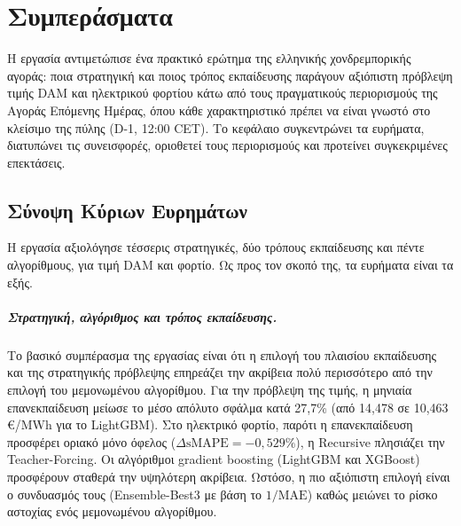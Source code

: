 \chapter{Συμπεράσματα}
\label{ch:conclusions}

Η εργασία αντιμετώπισε ένα πρακτικό ερώτημα της ελληνικής χονδρεμπορικής αγοράς: ποια
στρατηγική και ποιος τρόπος εκπαίδευσης παράγουν αξιόπιστη πρόβλεψη τιμής DAM και
ηλεκτρικού φορτίου κάτω από τους πραγματικούς περιορισμούς της Αγοράς Επόμενης Ημέρας,
όπου κάθε χαρακτηριστικό πρέπει να είναι γνωστό στο κλείσιμο της πύλης (D-1, 12:00 CET).
Το κεφάλαιο συγκεντρώνει τα ευρήματα, διατυπώνει τις συνεισφορές, οριοθετεί τους
περιορισμούς και προτείνει συγκεκριμένες επεκτάσεις.

\section{Σύνοψη Κύριων Ευρημάτων}
\label{sec:conc_findings}

Η εργασία αξιολόγησε τέσσερις στρατηγικές, δύο τρόπους εκπαίδευσης και πέντε
αλγορίθμους, για τιμή DAM και φορτίο. Ως προς τον σκοπό της, τα ευρήματα είναι τα εξής.

\paragraph{Στρατηγική, αλγόριθμος και τρόπος εκπαίδευσης.}
Το βασικό συμπέρασμα της εργασίας είναι ότι η επιλογή του πλαισίου εκπαίδευσης και της 
στρατηγικής πρόβλεψης επηρεάζει την ακρίβεια πολύ περισσότερο από την επιλογή του 
μεμονωμένου αλγορίθμου. Για την πρόβλεψη της τιμής, η μηνιαία επανεκπαίδευση μείωσε το μέσο απόλυτο 
σφάλμα κατά 27,7\% (από 14,478 σε 10,463 €/MWh για το LightGBM).
Στο ηλεκτρικό φορτίο, παρότι η επανεκπαίδευση προσφέρει οριακό μόνο όφελος ($\Delta\text{sMAPE} = -0,529\%$),
η Recursive πλησιάζει την Teacher-Forcing.
Οι αλγόριθμοι gradient boosting (LightGBM και XGBoost) προσφέρουν σταθερά την υψηλότερη ακρίβεια.
Ωστόσο, η πιο αξιόπιστη επιλογή είναι ο συνδυασμός τους (Ensemble-Best3 με βάση το $1/\text{MAE}$)
καθώς μειώνει το ρίσκο αστοχίας ενός μεμονωμένου αλγορίθμου.

